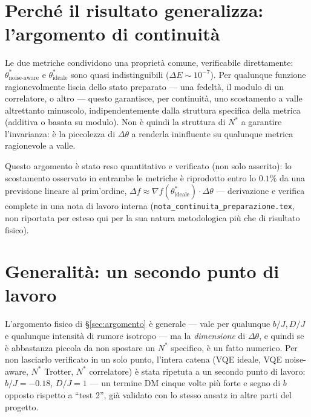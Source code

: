 \documentclass[11pt,a4paper]{article}
\begin{document}
\section{Perché il risultato generalizza: l'argomento di continuità}
\label{sec:continuita}

Le due metriche condividono una proprietà comune, verificabile
direttamente: $\theta^*_\text{noise-aware}$ e $\theta^*_\text{ideale}$
sono quasi indistinguibili ($\Delta E\sim10^{-7}$). Per qualunque
funzione ragionevolmente liscia dello stato preparato --- una fedeltà,
il modulo di un correlatore, o altro --- questo garantisce, per
continuità, uno scostamento a valle altrettanto minuscolo,
indipendentemente dalla struttura specifica della metrica (additiva o
basata su modulo). Non è quindi la struttura di $N^*$ a garantire
l'invarianza: è la piccolezza di $\Delta\theta$ a renderla ininfluente su
qualunque metrica ragionevole a valle.

Questo argomento è stato reso quantitativo e verificato (non solo
asserito): lo scostamento osservato in entrambe le metriche è riprodotto
entro lo $0.1\%$ da una previsione lineare al prim'ordine,
$\Delta f\approx\nabla f(\theta^*_\text{ideale})\cdot\Delta\theta$ ---
derivazione e verifica complete in una nota di lavoro interna
(\texttt{nota\_continuita\_preparazione.tex}, non riportata per esteso
qui per la sua natura metodologica più che di risultato fisico).

\section{Generalità: un secondo punto di lavoro}
\label{sec:secondo-punto}

L'argomento fisico di §\ref{sec:argomento} è generale --- vale per
qualunque $b/J,D/J$ e qualunque intensità di rumore isotropo --- ma la
\emph{dimensione} di $\Delta\theta$, e quindi se è abbastanza piccola da
non spostare un $N^*$ specifico, è un fatto numerico. Per non lasciarlo
verificato in un solo punto, l'intera catena (VQE ideale, VQE
noise-aware, $N^*$ Trotter, $N^*$ correlatore) è stata ripetuta a un
secondo punto di lavoro: $b/J=-0.18$, $D/J=1$ --- un termine DM cinque
volte più forte e segno di $b$ opposto rispetto a ``test 2'', già
validato con lo stesso ansatz in altre parti del progetto.
\end{document}
